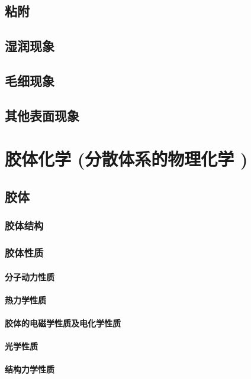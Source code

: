 \documentclass[UTF8]{../03-Chemistry}
\begin{document}
\section{粘附}
\section{湿润现象}
\section{毛细现象}
\section{其他表面现象}








\chapter{胶体化学 (分散体系的物理化学 )}
\section{胶体}
    \subsection{胶体结构}
    \subsection{胶体性质}
        \subsubsection{分子动力性质}
        \subsubsection{热力学性质}
        \subsubsection{胶体的电磁学性质及电化学性质}
        \subsubsection{光学性质}
        \subsubsection{结构力学性质}
\end{document}
